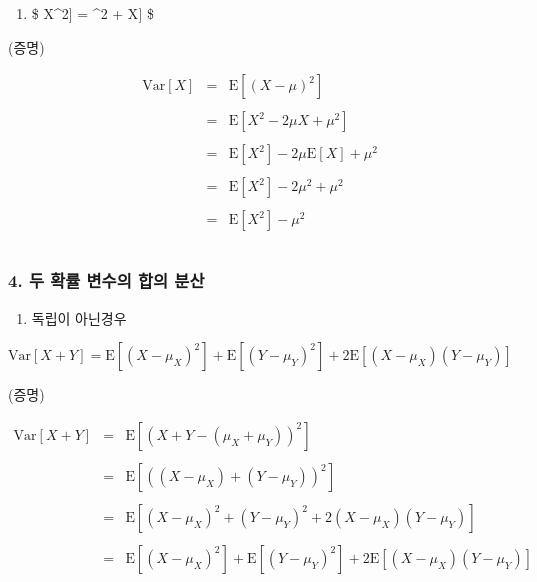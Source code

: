 \documentclass[11pt]{article}
\providecommand{\tightlist}{%
      \setlength{\itemsep}{0pt}\setlength{\parskip}{0pt}}
\begin{document}
    \begin{enumerate}
\def\labelenumi{\arabic{enumi})}
\setcounter{enumi}{4}
\tightlist
\item
  \$ \text{E}{[}X\^{}2{]} = \mu\^{}2 + \text{Var}{[}X{]} \$
\end{enumerate}

    (증명)

\[ 
\begin{eqnarray}
\text{Var}[X] 
&=& \text{E}[(X - \mu)^2] \\\\
&=& \text{E}[X^2 - 2\mu X + \mu^2] \\\\
&=& \text{E}[X^2] - 2\mu\text{E}[X] + \mu^2 \\\\
&=& \text{E}[X^2] - 2\mu^2 + \mu^2 \\\\
&=& \text{E}[X^2] - \mu^2\\\\
\end{eqnarray}
\]

    \hypertarget{uxb450-uxd655uxb960-uxbcc0uxc218uxc758-uxd569uxc758-uxbd84uxc0b0}{%
\subsubsection{4. 두 확률 변수의 합의
분산}\label{uxb450-uxd655uxb960-uxbcc0uxc218uxc758-uxd569uxc758-uxbd84uxc0b0}}

    \begin{enumerate}
\def\labelenumi{\arabic{enumi})}
\tightlist
\item
  독립이 아닌경우
\end{enumerate}

    \[\text{Var}\left[ X + Y \right] = \text{E}\left[ (X -\mu_X)^2 \right] + \text{E}\left[ (Y - \mu_Y)^2 \right] + 2\text{E}\left[ (X-\mu_X)(Y-\mu_Y) \right]\]

    (증명)

\[\begin{eqnarray}
\text{Var}\left[ X + Y \right] 
&=& \text{E}\left[ (X + Y - (\mu_X + \mu_Y))^2 \right] \\\\
&=& \text{E}\left[ ((X -\mu_X) + (Y - \mu_Y))^2 \right] \\\\
&=& \text{E}\left[ (X -\mu_X)^2 + (Y - \mu_Y)^2 + 2(X-\mu_X)(Y-\mu_Y) \right] \\\\
&=& \text{E}\left[ (X -\mu_X)^2 \right] + \text{E}\left[ (Y - \mu_Y)^2 \right] + 2\text{E}\left[ (X-\mu_X)(Y-\mu_Y) \right] 
\end{eqnarray}\]
\end{document}
